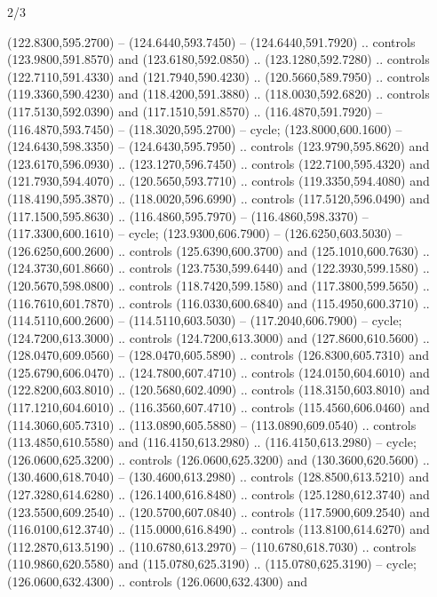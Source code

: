 \begin{flagdescription}{2/3}
\begin{scope} [xshift=0.5\flaglength,yshift=\flagwidth/3.75]
\begin{scope}[y=-\flagwidth/358, x=\flagwidth/346,xshift=-0.565\flagwidth,
   yshift=2.0084\flagwidth]
\begin{scope}[draw=black,fill=white,line width=0.768\lw]
 (122.8300,595.2700) -- (124.6440,593.7450) --
  (124.6440,591.7920) .. controls (123.9800,591.8570) and (123.6180,592.0850) ..
  (123.1280,592.7280) .. controls (122.7110,591.4330) and (121.7940,590.4230) ..
  (120.5660,589.7950) .. controls (119.3360,590.4230) and (118.4200,591.3880) ..
  (118.0030,592.6820) .. controls (117.5130,592.0390) and (117.1510,591.8570) ..
  (116.4870,591.7920) -- (116.4870,593.7450) -- (118.3020,595.2700) -- cycle;
 (123.8000,600.1600) -- (124.6430,598.3350) --
  (124.6430,595.7950) .. controls (123.9790,595.8620) and (123.6170,596.0930) ..
  (123.1270,596.7450) .. controls (122.7100,595.4320) and (121.7930,594.4070) ..
  (120.5650,593.7710) .. controls (119.3350,594.4080) and (118.4190,595.3870) ..
  (118.0020,596.6990) .. controls (117.5120,596.0490) and (117.1500,595.8630) ..
  (116.4860,595.7970) -- (116.4860,598.3370) -- (117.3300,600.1610) -- cycle;
 (123.9300,606.7900) -- (126.6250,603.5030) --
  (126.6250,600.2600) .. controls (125.6390,600.3700) and (125.1010,600.7630) ..
  (124.3730,601.8660) .. controls (123.7530,599.6440) and (122.3930,599.1580) ..
  (120.5670,598.0800) .. controls (118.7420,599.1580) and (117.3800,599.5650) ..
  (116.7610,601.7870) .. controls (116.0330,600.6840) and (115.4950,600.3710) ..
  (114.5110,600.2600) -- (114.5110,603.5030) -- (117.2040,606.7900) -- cycle;
 (124.7200,613.3000) .. controls (124.7200,613.3000) and
  (127.8600,610.5600) .. (128.0470,609.0560) -- (128.0470,605.5890) .. controls
  (126.8300,605.7310) and (125.6790,606.0470) .. (124.7800,607.4710) .. controls
  (124.0150,604.6010) and (122.8200,603.8010) .. (120.5680,602.4090) .. controls
  (118.3150,603.8010) and (117.1210,604.6010) .. (116.3560,607.4710) .. controls
  (115.4560,606.0460) and (114.3060,605.7310) .. (113.0890,605.5880) --
  (113.0890,609.0540) .. controls (113.4850,610.5580) and (116.4150,613.2980) ..
  (116.4150,613.2980) -- cycle;
 (126.0600,625.3200) .. controls (126.0600,625.3200) and
  (130.3600,620.5600) .. (130.4600,618.7040) -- (130.4600,613.2980) .. controls
  (128.8500,613.5210) and (127.3280,614.6280) .. (126.1400,616.8480) .. controls
  (125.1280,612.3740) and (123.5500,609.2540) .. (120.5700,607.0840) .. controls
  (117.5900,609.2540) and (116.0100,612.3740) .. (115.0000,616.8490) .. controls
  (113.8100,614.6270) and (112.2870,613.5190) .. (110.6780,613.2970) --
  (110.6780,618.7030) .. controls (110.9860,620.5580) and (115.0780,625.3190) ..
  (115.0780,625.3190) -- cycle;
 (126.0600,632.4300) .. controls (126.0600,632.4300) and

\end{scope}
\end{scope}
\end{scope}
\end{flagdescription}
